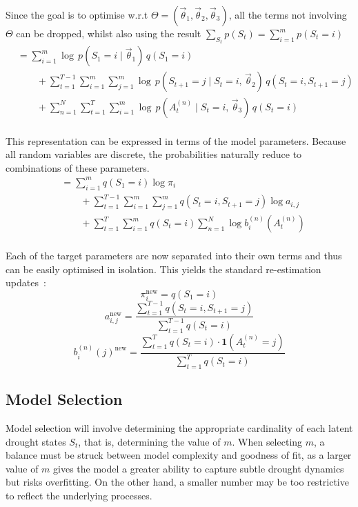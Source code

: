 Since the goal is to optimise w.r.t $\Theta = (\vec{\theta}_1,\vec{\theta}_2,\vec{\theta}_3)$, all the terms not involving $\Theta$ can be dropped, whilst also using the result $\sum\limits_{S_t} p(S_t) = \sum\limits_{i=1}^m p(S_t = i)$
\begin{align*}
    &= \sum\limits_{i=1}^m \log \, p(S_1 = i \mid \vec{\theta}_1) \, q(S_1 = i) \\
    & \qquad + \sum\limits_{t=1}^{T-1} \sum\limits_{i=1}^m \sum\limits_{j=1}^m \log \, p(S_{t+1} = j \mid S_t = i, \, \vec{\theta}_2) \, q(S_t = i, S_{t+1} = j) \\
    &\qquad + \sum\limits_{n=1}^N \sum\limits_{t=1}^T \sum\limits_{i=1}^m \log \, p(A_t^{(n)} \mid S_t = i, \, \vec{\theta}_3) \, q(S_t = i) \\
\end{align*}

This representation can be expressed in terms of the model parameters. Because all random variables are discrete, the probabilities naturally reduce to combinations of these parameters.
\begin{align*}
    &= \sum_{i=1}^m q(S_1 = i) \log \pi_i \\
    &\qquad + \sum_{t=1}^{T-1}\sum_{i=1}^m\sum_{j=1}^m q(S_t=i,S_{t+1}=j)\log a_{i,j}\\ 
    &\qquad +  \sum\limits_{t=1}^T \sum\limits_{i=1}^m  q(S_t = i)  \sum\limits_{n=1}^N \log b_i^{(n)}(A_t^{(n)}) \\
\end{align*}

Each of the target parameters are now separated into their own terms and thus can be easily optimised in isolation. This yields the standard re-estimation updates~\cite{jm3,xing_slides}:
\begin{equation}
    \boxed{\;\pi_i^{\text{new}} = q(S_1=i)\;}
    \label{eqn:prior_update_rule}
\end{equation}
\begin{equation}
    \boxed{\;a_{i,j}^{\text{new}}=\frac{\sum\limits_{t=1}^{T-1} q(S_t=i,S_{t+1}=j)}{\sum\limits_{t=1}^{T-1} q(S_t=i)}\;}
    \label{eqn:transition_update_rule}
\end{equation}
\begin{equation}
    \boxed{\; b_i^{(n)}(j)^{\text{new}} = \frac{\sum\limits_{t=1}^T q(S_t = i) \cdot \mathbf{1}(A_t^{(n)} = j)}{\sum\limits_{t=1}^T q(S_t = i)} \;}
    \label{eqn:emission_update_rule}
\end{equation}

\subsection{Model Selection}
Model selection will involve determining the appropriate cardinality of each latent drought states $S_t$, that is, determining the value of $m$. When selecting $m$, a balance must be struck between model complexity and goodness of fit, as a larger value of $m$ gives the model a greater ability to capture subtle drought dynamics but risks overfitting. On the other hand, a smaller number may be too restrictive to reflect the underlying processes.

